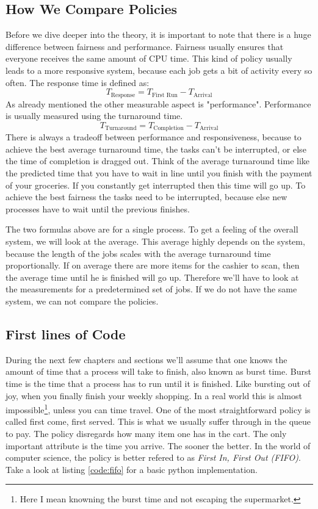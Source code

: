 \subsection{How We Compare Policies}

Before we dive deeper into the theory, it is important to note that there is a huge difference between fairness and performance.
Fairness usually ensures that everyone receives the same amount of CPU time.
This kind of policy usually leads to a more responsive system, because each job gets a bit of activity every so often.
The response time is defined as:
$$T_{\text{Response}} = T_{\text{First Run}} - T_{\text{Arrival}}$$
As already mentioned the other measurable aspect is "performance".
Performance is usually measured using the turnaround time.
$$T_{\text{Turnaround}} = T_{\text{Completion}} - T_{\text{Arrival}}$$
There is always a tradeoff between performance and responsiveness, because to achieve the best average turnaround time, the tasks can't be interrupted, or else the time of completion is dragged out.
Think of the average turnaround time like the predicted time that you have to wait in line until you finish with the payment of your groceries. If you constantly get interrupted then this time will go up.
To achieve the best fairness the tasks need to be interrupted, because else new processes have to wait until the previous finishes.

The two formulas above are for a single process. To get a feeling of the overall system, we will look at the average. This average highly depends on the system, because the length of the jobs scales with the average turnaround time proportionally.
If on average there are more items for the cashier to scan, then the average time until he is finished will go up.
Therefore we’ll have to look at the measurements for a predetermined set of jobs.
If we do not have the same system, we can not compare the policies.

\subsection{First lines of Code} \label{sec:first-lines-of-code}

During the next few chapters and sections we'll assume that one knows the amount of time that a process will take to finish, also known as burst time.
Burst time is the time that a process has to run until it is finished.
Like bursting out of joy, when you finally finish your weekly shopping.
In a real world this is almost impossible\footnote{Here I mean knowning the burst time and not escaping the supermarket.}, unless you can time travel.
One of the most straightforward policy is called first come, first served.
This is what we usually suffer through in the queue to pay.
The policy disregards how many item one has in the cart.
The only important attribute is the time you arrive.
The sooner the better.
In the world of computer science, the policy is better refered to as \emph{First In, First Out (FIFO)}.
Take a look at listing \ref{code:fifo} for a basic python implementation.

